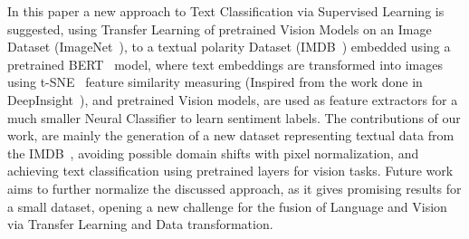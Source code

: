 \documentclass[conference]{IEEEtran}
\begin{document}
  In this paper a new approach to Text Classification via Supervised Learning is suggested, using Transfer Learning of pretrained Vision Models on an Image Dataset (ImageNet~\cite{imagenet}), to a textual polarity Dataset (IMDB~\cite{imdb}) embedded using a pretrained BERT~\cite{Bert} model, where text embeddings are transformed into images using t-SNE~\cite{tsne} feature similarity measuring (Inspired from the work done in DeepInsight~\cite{deepinsight}), and pretrained Vision models, are used as feature extractors for a much smaller Neural Classifier to learn sentiment labels.
  The contributions of our work, are mainly the generation of a new dataset representing textual data from the IMDB~\cite{imdb}, avoiding possible domain shifts with pixel normalization, and achieving text classification using pretrained layers for vision tasks. Future work aims to further normalize the discussed approach, as it gives promising results for a small dataset, opening a new challenge for the fusion of Language and Vision via Transfer Learning and Data transformation.

			


\end{document}
